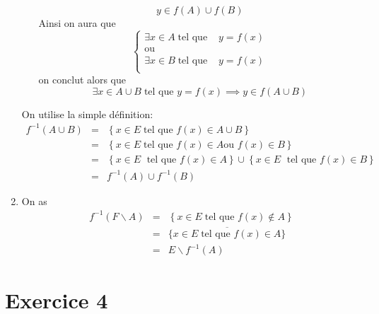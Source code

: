 \documentclass{report}
\begin{document}
\begin{myproof}
\begin{enumerate}
\begin{enumerate}
    $$
    y\in f(A)\cup f(B)
    $$
    Ainsi on aura que 
    $$
    \begin{cases}
      \exists x \in A \; \text{tel que } &y = f(x)\\
      \text{ou} & \\
      \exists x \in B \; \text{tel que } &y = f(x)\\
    \end{cases}
    $$
    on conclut alors que 
    $$
    \exists x \in A\cup B \; \text{tel que } y = f(x) \implies y \in f(A\cup B)
    $$
    \end{enumerate}
    On utilise la simple définition:
    \begin{eqnarray*}
      f^{-1}(A\cup B) &=&  \left\{ x \in E \; \text{tel que } f(x) \in A \cup
      B\right\}\\
                      & = & \left\{x \in E \; \text{tel que } f(x) \in A \text{
                        ou } f(x) \in B\right\}\\
                        &=& \left\{x\in E \;\text{ tel que } f(x) \in A \right\}
                        \cup \left\{x\in E \;\text{ tel que } f(x) \in B
                        \right\}\\
                        &= & f^{-1}(A) \cup f^{-1}(B)
    \end{eqnarray*}
    
  \item
    On as 
    \begin{eqnarray*}
      f^{-1}(F\backslash A) & = &\left\{x\in E\;\text{tel que } f(x) \not\in
      A\right\}\\[4pt]
                            &=& \overline{\{x\in E\;\text{tel que } f(x)\in
                            A\}}\\[4pt]
                            &=& E \backslash f^{-1}(A)
    \end{eqnarray*}
\end{enumerate}

  
\end{myproof}


\section{Exercice 4}
\end{document}
